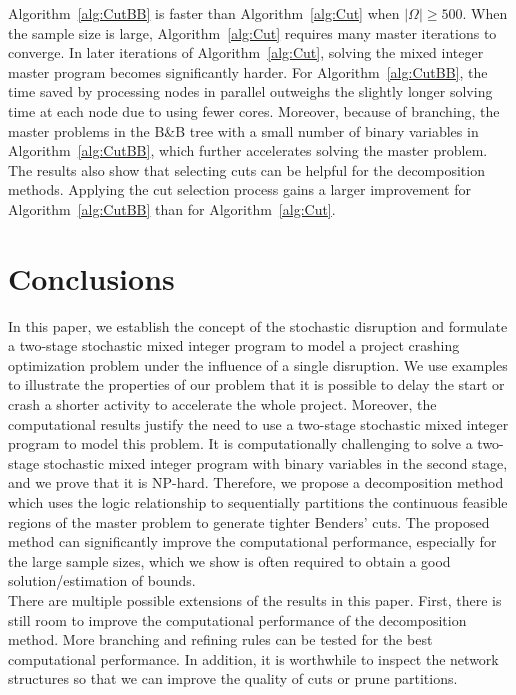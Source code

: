 \documentclass[11pt]{article}
\begin{document}
	\newline
	Algorithm~\ref{alg:CutBB} is faster than Algorithm~\ref{alg:Cut} when \(|\Omega| \geq 500\). When the sample size is large, Algorithm~\ref{alg:Cut} requires many master iterations to converge. In later iterations of Algorithm~\ref{alg:Cut}, solving the mixed integer master program becomes significantly harder. For Algorithm~\ref{alg:CutBB}, the time saved by processing nodes in parallel outweighs the slightly longer solving time at each node due to using fewer cores. Moreover, because of branching, the master problems in the B\&B tree with a small number of binary variables in Algorithm~\ref{alg:CutBB}, which further accelerates solving the master problem. 
	The results also show that selecting cuts can be helpful for the decomposition methods. Applying the cut selection process gains a larger improvement for Algorithm~\ref{alg:CutBB} than for Algorithm~\ref{alg:Cut}. 
	
	\section{Conclusions} \label{sec:conclusions}
	In this paper, we establish the concept of the stochastic disruption and formulate a two-stage stochastic mixed integer program to model a project crashing optimization problem under the influence of a single disruption. We use examples to illustrate the properties of our problem that it is possible to delay the start or crash a shorter activity to accelerate the whole project. Moreover, the computational results justify the need to use a two-stage stochastic mixed integer program to model this problem. It is computationally challenging to solve a two-stage stochastic mixed integer program with binary variables in the second stage, and we prove that it is NP-hard. Therefore, we propose a decomposition method which uses the logic relationship to sequentially partitions the continuous feasible regions of the master problem to generate tighter Benders' cuts. The proposed method can significantly improve the computational performance, especially for the large sample sizes, which we show is often required to obtain a good solution/estimation of bounds.\\
	\newline
	There are multiple possible extensions of the results in this paper. First, there is still room to improve the computational performance of the decomposition method. More branching and refining rules can be tested for the best computational performance. In addition, it is worthwhile to inspect the network structures so that we can improve the quality of cuts or prune partitions. 
	
\end{document}
